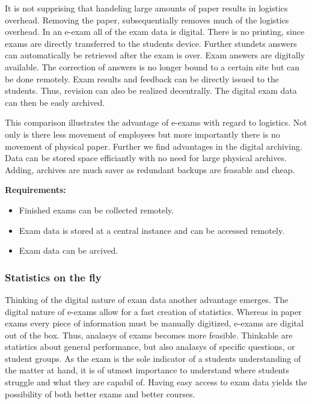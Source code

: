 It is not supprising that handeling large amounts of paper results in
logistics overhead. Removing the paper, subsequentially removes much of
the logistics overhead. In an e-exam all of the exam data is digital.
There is no printing, since exams are directly transferred to the
students device. Further stundets answers can automatically be retrieved
after the exam is over. Exam answers are digitally available. The
correction of answers is no longer bound to a certain site but can be
done remotely. Exam results and feedback can be directly issued to the
students. Thus, revision can also be realized decentrally. The digital
exam data can then be easly archived.

This comparison illustrates the advantage of e-exams with regard to
logistics. Not only is there less movement of employees but more
importantly there is no movement of physical paper. Further we find
advantages in the digital archiving. Data can be stored space
efficiantly with no need for large physical archives. Adding, archives
are much saver as redundant backups are feasable and cheap.

\textbf{Requirements:}

\begin{itemize}
\tightlist
\item
  Finished exams can be collected remotely.
\item
  Exam data is stored at a central instance and can be accessed
  remotely.
\item
  Exam data can be arcived.
\end{itemize}

\hypertarget{statistics-on-the-fly}{%
\subsubsection{Statistics on the fly}\label{statistics-on-the-fly}}

Thinking of the digital nature of exam data another advantage emerges.
The digital nature of e-exams allow for a fast creation of statistics.
Whereas in paper exams every piece of information must be manually
digitized, e-exams are digital out of the box. Thus, analasys of exams
becomes more feasible. Thinkable are statistics about general
performance, but also analasys of specific questions, or student groups.
As the exam is the sole indicator of a students understanding of the
matter at hand, it is of utmost importance to understand where students
struggle and what they are capabil of. Having easy access to exam data
yields the possibility of both better exams and better courses.

